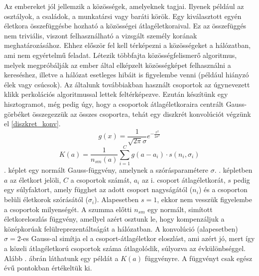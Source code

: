 \documentclass[12pt]{article}
\begin{document}
Az embereket jól jellemzik a közösségek, amelyeknek tagjai. Ilyenek például az osztályok, a családok, a munkatársi vagy baráti körök. Egy kiválasztott egyén életkora összefüggésbe hozható a közösségei átlagéletkoraival. Ez az összefüggés nem triviális, viszont felhasználható a vizsgált személy korának meghatározásához. Ehhez először fel kell térképezni a közösségeket a hálózatban, ami nem egyértelmű feladat. Létezik \iffalse TODO: létezik helyett valami más szó \fi többfajta közösségfelismerő algoritmus, melyek megpróbálják az ember által elképzelt közösségképet felhasználni a kereséshez, illetve a hálózat esetleges hibáit is figyelembe venni (például hiányzó élek vagy csúcsok). Az általunk továbbiakban használt csoportok az úgynevezett klikk perkolációs algoritmussal \cite{tamas_gabor_tdk} \iffalse TODO: kell ez? \fi lettek feltérképezve. %
Ezután készítünk egy hisztogramot, még pedig úgy, hogy a csoportok átlagéletkoraira centrált Gauss-görbéket összegezzük az összes csoportra, tehát egy diszkrét konvolúciót végzünk el \eqref{diszkret_konv}.
\begin{equation} \label{simito_gauss}
	g(x) = \frac{1}{\sqrt{2\pi}\sigma}e^{-\frac{x^2}{2\sigma^2}}
\end{equation}
\begin{equation} \label{diszkret_konv}
	K(a) = \frac{1}{n_{sm}(a)}\sum_{i=1}^{C} g(a-a_i) \cdot s(n_{i}, \sigma_{i}) %
\end{equation} %
. képlet egy normált Gauss-függvény, amelynek a szórásparamétere $\sigma$. . képletben $a$ az életkort jelöli, $C$ a csoportok számát, $a_i$ az i. csoport átlagéletkorát, $s$ pedig egy súlyfaktort, amely függhet az adott csoport nagyságától ($n_{i}$) és a csoporton belüli életkorok szórásától ($\sigma_i$). Alapesetben $s=1$, ekkor nem vesszük figyelembe a csoportok milyenségét\iffalse TODO: minőségét \fi. A szumma előtti $n_{sm}$ egy normált, simított életkoreloszlás függvény, amellyel azért osztunk le, hogy kompenzáljuk a középkorúak felülreprezentáltságát a hálózatban. 
A konvolúció (alapesetben) $\sigma = 2$-es Gauss-al simítja el a csoport-átlagéletkor eloszlást, ami azért jó, mert így a közeli átlagéletkorú csoportok száma átlagolódik, súlyozva az évkülönbséggel. \iffalse TODO: ez lehet nem túl világos \fi Alább . ábrán láthatunk egy példát a $K(a)$ függvényre. A függvényt csak egész évű pontokban értékeltük ki.
\end{document}
